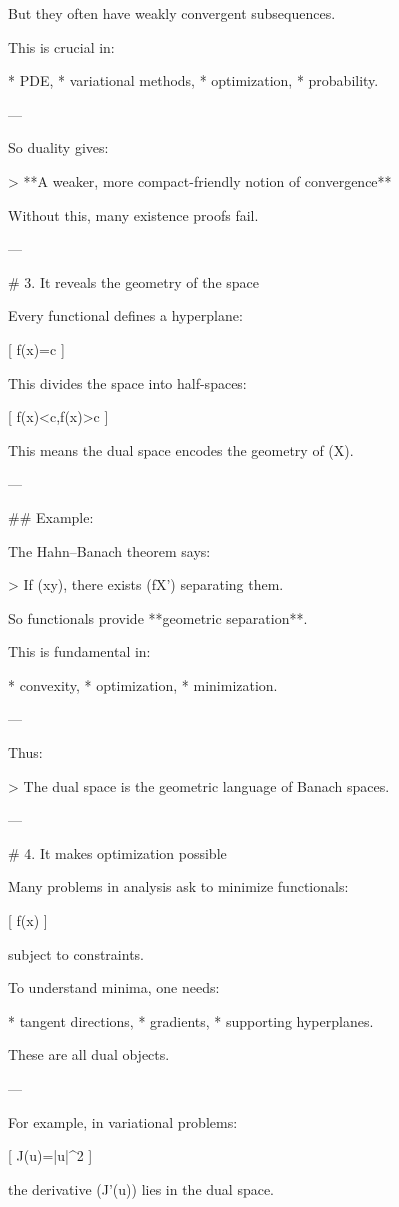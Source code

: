 \begin{description}
But they often have weakly convergent subsequences.

This is crucial in:

* PDE,
* variational methods,
* optimization,
* probability.

---

So duality gives:

> **A weaker, more compact-friendly notion of convergence**

Without this, many existence proofs fail.

---

# 3. It reveals the geometry of the space

Every functional defines a hyperplane:

[
f(x)=c
]

This divides the space into half-spaces:

[
f(x)<c,\qquad f(x)>c
]

This means the dual space encodes the geometry of (X).

---

## Example:

The Hahn–Banach theorem says:

> If (x\neq y), there exists (f\in X') separating them.

So functionals provide **geometric separation**.

This is fundamental in:

* convexity,
* optimization,
* minimization.

---

Thus:

> The dual space is the geometric language of Banach spaces.

---

# 4. It makes optimization possible

Many problems in analysis ask to minimize functionals:

[
f(x)
]

subject to constraints.

To understand minima, one needs:

* tangent directions,
* gradients,
* supporting hyperplanes.

These are all dual objects.

---

For example, in variational problems:

[
J(u)=\int |\nabla u|^2
]

the derivative (J'(u)) lies in the dual space.


\end{description}
